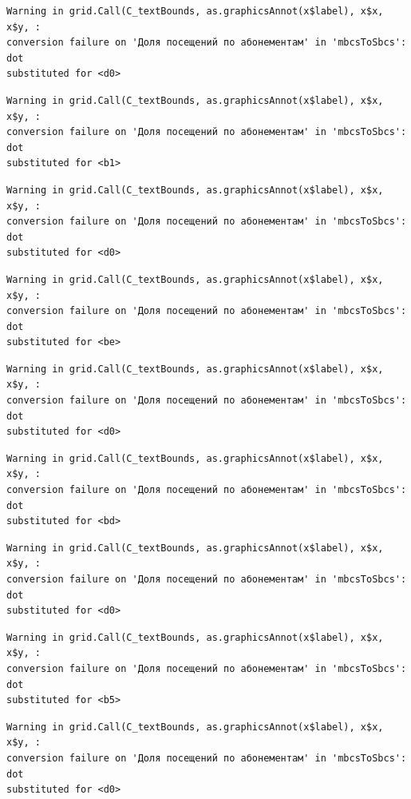 \documentclass[
  letterpaper,
  DIV=11,
  numbers=noendperiod]{scrartcl}
\begin{document}
\begin{verbatim}
Warning in grid.Call(C_textBounds, as.graphicsAnnot(x$label), x$x, x$y, :
conversion failure on 'Доля посещений по абонементам' in 'mbcsToSbcs': dot
substituted for <d0>
\end{verbatim}

\begin{verbatim}
Warning in grid.Call(C_textBounds, as.graphicsAnnot(x$label), x$x, x$y, :
conversion failure on 'Доля посещений по абонементам' in 'mbcsToSbcs': dot
substituted for <b1>
\end{verbatim}

\begin{verbatim}
Warning in grid.Call(C_textBounds, as.graphicsAnnot(x$label), x$x, x$y, :
conversion failure on 'Доля посещений по абонементам' in 'mbcsToSbcs': dot
substituted for <d0>
\end{verbatim}

\begin{verbatim}
Warning in grid.Call(C_textBounds, as.graphicsAnnot(x$label), x$x, x$y, :
conversion failure on 'Доля посещений по абонементам' in 'mbcsToSbcs': dot
substituted for <be>
\end{verbatim}

\begin{verbatim}
Warning in grid.Call(C_textBounds, as.graphicsAnnot(x$label), x$x, x$y, :
conversion failure on 'Доля посещений по абонементам' in 'mbcsToSbcs': dot
substituted for <d0>
\end{verbatim}

\begin{verbatim}
Warning in grid.Call(C_textBounds, as.graphicsAnnot(x$label), x$x, x$y, :
conversion failure on 'Доля посещений по абонементам' in 'mbcsToSbcs': dot
substituted for <bd>
\end{verbatim}

\begin{verbatim}
Warning in grid.Call(C_textBounds, as.graphicsAnnot(x$label), x$x, x$y, :
conversion failure on 'Доля посещений по абонементам' in 'mbcsToSbcs': dot
substituted for <d0>
\end{verbatim}

\begin{verbatim}
Warning in grid.Call(C_textBounds, as.graphicsAnnot(x$label), x$x, x$y, :
conversion failure on 'Доля посещений по абонементам' in 'mbcsToSbcs': dot
substituted for <b5>
\end{verbatim}

\begin{verbatim}
Warning in grid.Call(C_textBounds, as.graphicsAnnot(x$label), x$x, x$y, :
conversion failure on 'Доля посещений по абонементам' in 'mbcsToSbcs': dot
substituted for <d0>
\end{verbatim}
\end{document}
